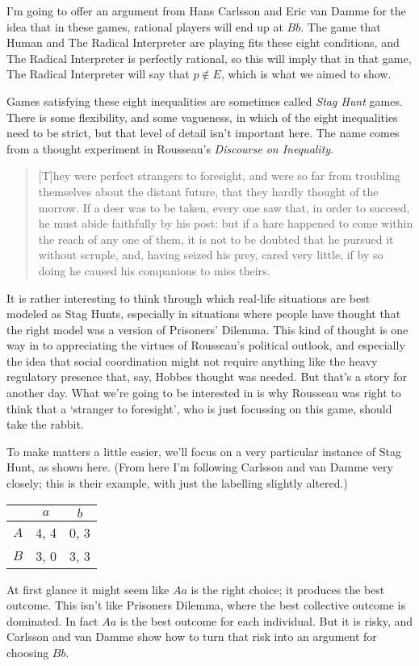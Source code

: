 \documentclass{article}
\begin{document}
I'm going to offer an argument from Hans Carlsson and Eric van Damme \citeyearpar{CarlssonVanDamme1993} for the idea that in these games, rational players will end up at $Bb$. The game that Human and The Radical Interpreter are playing fits these eight conditions, and The Radical Interpreter is perfectly rational, so this will imply that in that game, The Radical Interpreter will say that $p \notin E$, which is what we aimed to show.

Games satisfying these eight inequalities are sometimes called \emph{Stag Hunt} games. There is some flexibility, and some vagueness, in which of the eight inequalities need to be strict, but that level of detail isn't important here. The name comes from a thought experiment in Rousseau's \emph{Discourse on Inequality}. 

\begin{quote}

[T]hey were perfect strangers to foresight, and were so far from troubling themselves about the distant future, that they hardly thought of the morrow. If a deer was to be taken, every one saw that, in order to succeed, he must abide faithfully by his post: but if a hare happened to come within the reach of any one of them, it is not to be doubted that he pursued it without scruple, and, having seized his prey, cared very little, if by so doing he caused his companions to miss theirs. ~\citep[209--10]{Rousseau1913}
\end{quote}
It is rather interesting to think through which real-life situations are best modeled as Stag Hunts, especially in situations where people have thought that the right model was a version of Prisoners' Dilemma. This kind of thought is one way in to appreciating the virtues of Rousseau's political outlook, and especially the idea that social coordination might not require anything like the heavy regulatory presence that, say, Hobbes thought was needed. But that's a story for another day. What we're going to be interested in is why Rousseau was right to think that a `stranger to foresight', who is just focussing on this game, should take the rabbit.

To make matters a little easier, we'll focus on a very particular instance of Stag Hunt, as shown here. (From here I'm following Carlsson and van Damme very closely; this is their example, with just the labelling slightly altered.)

\begin{center}
\begin{tabular}{r | c c}
& $a$ & $b$ \\\hline
$A$ & 4, 4 & 0, 3 \\
$B$ & 3, 0 & 3, 3
\end{tabular}
\end{center}
At first glance it might seem like $Aa$ is the right choice; it produces the best outcome. This isn't like Prisoners Dilemma, where the best collective outcome is dominated. In fact $Aa$ is the best outcome for each individual. But it is risky, and Carlsson and van Damme show how to turn that risk into an argument for choosing $Bb$.
\end{document}
